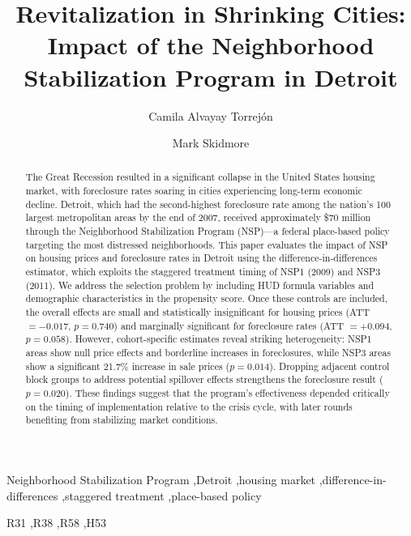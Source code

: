 \documentclass[12pt,authoryear]{elsarticle}
\begin{document}
\begin{frontmatter}

\title{Revitalization in Shrinking Cities: Impact of the Neighborhood Stabilization Program in Detroit}

\author[ucn]{Camila Alvayay Torrej\'on}
\author[msu]{Mark Skidmore}



\begin{abstract}
The Great Recession resulted in a significant collapse in the United States housing market, with foreclosure rates soaring in cities experiencing long-term economic decline. Detroit, which had the second-highest foreclosure rate among the nation's 100 largest metropolitan areas by the end of 2007, received approximately \$70 million through the Neighborhood Stabilization Program (NSP)---a federal place-based policy targeting the most distressed neighborhoods. This paper evaluates the impact of NSP on housing prices and foreclosure rates in Detroit using the \citet{callaway2021} difference-in-differences estimator, which exploits the staggered treatment timing of NSP1 (2009) and NSP3 (2011). We address the selection problem by including HUD formula variables and demographic characteristics in the propensity score. Once these controls are included, the overall effects are small and statistically insignificant for housing prices (ATT $= -0.017$, $p = 0.740$) and marginally significant for foreclosure rates (ATT $= +0.094$, $p = 0.058$). However, cohort-specific estimates reveal striking heterogeneity: NSP1 areas show null price effects and borderline increases in foreclosures, while NSP3 areas show a significant 21.7\% increase in sale prices ($p = 0.014$). Dropping adjacent control block groups to address potential spillover effects strengthens the foreclosure result ($p = 0.020$). These findings suggest that the program's effectiveness depended critically on the timing of implementation relative to the crisis cycle, with later rounds benefiting from stabilizing market conditions.
\end{abstract}

\begin{keyword}
Neighborhood Stabilization Program \sep Detroit \sep housing market \sep difference-in-differences \sep staggered treatment \sep place-based policy
\end{keyword}

\begin{keyword}[JEL]
R31 \sep R38 \sep R58 \sep H53
\end{keyword}

\end{frontmatter}
\end{document}
